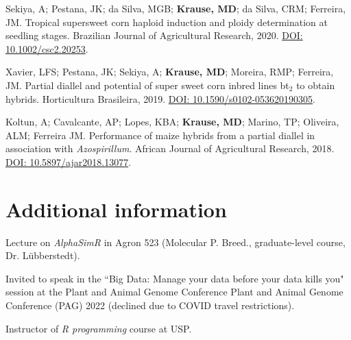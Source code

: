 \documentclass[]{mdkrause_cv_openfont}
\begin{document}
\begin{minipage}[t]{1\textwidth}
\sectionsep
Sekiya, A; Pestana, JK; da Silva, MGB; \textbf{Krause, MD}; da Silva, CRM; Ferreira, JM. Tropical supersweet corn haploid induction and ploidy determination at seedling stages. Brazilian Journal of Agricultural Research, 2020. \href{https://www.scielo.br/pdf/pab/v55/1678-3921-pab-55-e00968.pdf}{DOI: 10.1002/csc2.20253}. \ExternalLink 

\sectionsep
Xavier, LFS; Pestana, JK; Sekiya, A; \textbf{Krause, MD}; Moreira, RMP; Ferreira, JM. Partial diallel and potential of super sweet corn inbred lines bt$_2$ to obtain hybrids. Horticultura Brasileira, 2019. \href{http://www.scielo.br/scielo.php?script=sci_arttext&pid=S0102-05362019000300278}{DOI: 10.1590/s0102-053620190305}. \ExternalLink 

\sectionsep
Koltun, A; Cavalcante, AP; Lopes, KBA; \textbf{Krause, MD}; Marino, TP; Oliveira, ALM; Ferreira JM. Performance of maize hybrids from a partial diallel in association with \textit{Azospirillum}. African Journal of Agricultural Research, 2018. \href{https://academicjournals.org/journal/AJAR/article-abstract/B4A2A1B57541}{DOI: 10.5897/ajar2018.13077}. \ExternalLink

\sectionsep
{}

\sectionsep


\section{Additional information}

\sectionsep


\begin{tightemize}
	\vspace{3 mm}
	\item {} Lecture on \emph{AlphaSimR} in Agron 523 (Molecular P. Breed., graduate-level course, Dr. Lübberstedt). 
	\item {} Invited to speak in the ``Big Data: Manage your data before your data kills you" session at the Plant and Animal Genome Conference Plant and Animal Genome Conference (PAG) 2022 (declined due to COVID travel restrictions).
	\item {} Instructor of \emph{R programming} course at USP.
\end{tightemize}


\end{minipage}
\end{document}
